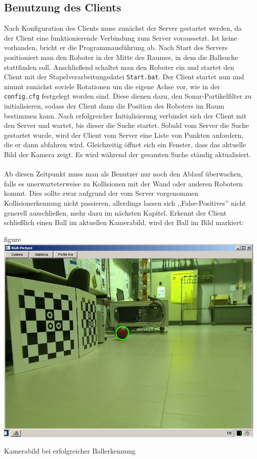 
\subsection{Benutzung des Clients}
\label{sec:benutz-des-clients}
Nach Konfiguration des Clients muss zunächst der Server gestartet
werden, da der Client eine funktionierende Verbindung zum Server
voraussetzt. Ist keine vorhanden, bricht er die Programmausführung ab.
Nach Start des Servers  positioniert man den Roboter in der Mitte des
Raumes, in dem die Ballsuche stattfinden soll. Anschließend schaltet
man den Roboter ein und startet den Client mit der
Stapelverarbeitungsdatei \verb|Start.bat|. Der Client startet nun und
nimmt zunächst soviele Rotationen um die eigene Achse vor, wie in der
\verb|config.cfg| festgelegt worden sind. Diese dienen dazu, den
Sonar-Partikelfilter zu initialisieren, sodass der Client dann die
Position des Roboters im Raum bestimmen kann. Nach erfolgreicher
Initialisierung verbindet sich der Client mit den Server und wartet,
bis dieser die Suche startet. Sobald vom Server die Suche gestartet
wurde, wird der Client vom Server eine Liste von Punkten anfordern,
die er dann abfahren wird. Gleichzeitig öffnet sich ein Fenster, dass
das aktuelle Bild der Kamera zeigt. Es wird während der gesamten Suche
ständig aktualisiert. \\\\
Ab diesen Zeitpunkt muss man als Benutzer
nur noch den Ablauf überwachen, falls es unerwarteterweise zu
Kollisionen mit der Wand oder anderen Robotern kommt. Dies sollte zwar
aufgrund der vom Server vorgenommen Kollisionerkennung nicht
passieren, allerdings lassen sich ,,False-Positives'' nicht generell
ausschließen, mehr dazu im nächsten Kapitel. Erkennt der Client
schließlich einen Ball im aktuellen Kamerabild, wird der Ball im Bild
markiert:
\begin{nofloat}{figure}\centering
\includegraphics[width=0.75\linewidth]{bilder/balldetect}
\caption{Kamerabild bei erfolgreicher Ballerkennung}  
\end{nofloat}

